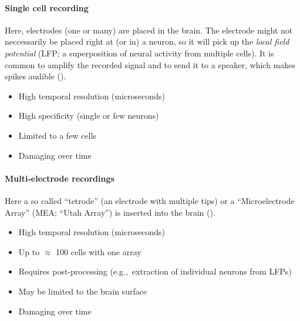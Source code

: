 \documentclass[10pt,letterpaper,oneside]{article}
\begin{document}
\paragraph{Single cell recording}
Here, electrodes (one or many) are placed in the brain. The electrode might not neccessarily be placed right at (or in) a neuron, so it will pick up the \emph{local field potential} (LFP; a superposition of neural activity from multiple cells). It is common to amplify the recorded signal and to send it to a speaker, which makes spikes audible ().
\begin{multicols}{2}
	\begin{itemize}
		\item[\OPlus] High temporal resolution (microseconds)
		\item[\OPlus] High specificity (single or few neurons)
	\end{itemize}
	\columnbreak
	\begin{itemize}
		\item[\OMinus] Limited to a few cells
		\item[\OMinus] Damaging over time
	\end{itemize}
\end{multicols}


\paragraph{Multi-electrode recordings}
Here a so called \enquote{tetrode} (an electrode with multiple tips) or a \enquote{Microelectrode Array} (MEA; \enquote{Utah Array}) is inserted into the brain ().
\begin{multicols}{2}
	\begin{itemize}
		\item[\OPlus] High temporal resolution (microseconds)
		\item[\OMeh] Up to $\approx$ 100 cells with one array
		\item[\OMeh] Requires post-processing (e.g.,~extraction of individual neurons from LFPs)
	\end{itemize}
	\columnbreak
	\begin{itemize}
		\item[\OMinus] May be limited to the brain surface
		\item[\OMinus] Damaging over time
	\end{itemize}
\end{multicols}
\end{document}
